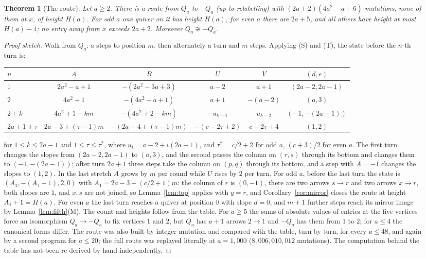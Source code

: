 \documentclass[11pt]{amsart}
\newtheorem{theorem}{Theorem}[section]
\theoremstyle{definition}
\theoremstyle{remark}
\begin{document}
\begin{theorem}[The route]\label{thm:qaroute}
Let $a\ge2$. There is a route from $Q_a$ to $-Q_a$ (up to relabelling) with $(2a+2)(4a^2-a+6)$ mutations, none of them at $x$, of height $H(a)$. For odd $a$ one quiver on it has height $H(a)$, for even $a$ there are $2a+5$, and all others have height at most $H(a)-1$; no entry away from $x$ exceeds $2a+2$. Moreover $Q_a\not\cong-Q_a$.
\end{theorem}
\begin{proof}[Proof sketch]
Walk from $Q_a$: $a$ steps to position $m$, then alternately a turn and $m$ steps. Applying (S) and (T), the state before the $n$-th turn is:
\begin{center}\footnotesize
\begin{tabular}{l@{\ \ }c@{\ \ }c@{\ \ }c@{\ \ }c@{\ \ }c}
\toprule
$n$ & $A$ & $B$ & $U$ & $V$ & $(d,e)$\\
\midrule
$1$ & $2a^2-a+1$ & $-(2a^2-3a+3)$ & $a-2$ & $a+1$ & $(2a-2,2a-1)$\\
$2$ & $4a^2+1$ & $-(4a^2-a+1)$ & $a+1$ & $-(a-2)$ & $(a,3)$\\
$2+k$ & $4a^2+1-km$ & $-(4a^2+2-km)$ & $-u_{k-1}$ & $u_{k-2}$ & $(-1,-(2a-1))$\\
$2a+1+\tau$ & $2a-3+(\tau-1)m$ & $-(2a-4+(\tau-1)m)$ & $-(c-2\tau+2)$ & $c-2\tau+4$ & $(1,2)$\\
\bottomrule
\end{tabular}
\end{center}
for $1\le k\le2a-1$ and $1\le\tau\le\tau^*$, where $u_i=a-2+i(2a-1)$, and $\tau^*=c/2+2$ for odd $a$, $(c+3)/2$ for even $a$. The first turn changes the slopes from $(2a-2,2a-1)$ to $(a,3)$, and the second passes the column on $(r,s)$ through its bottom and changes them to $(-1,-(2a-1))$; after turn $2a+1$ three steps take the column on $(p,q)$ through its bottom, and a step with $A=-1$ changes the slopes to $(1,2)$. In the last stretch $A$ grows by $m$ per round while $U$ rises by $2$ per turn. For odd $a$, before the last turn the state is $(A_1,-(A_1-1),2,0)$ with $A_1=2a-3+(c/2+1)m$: the column of $r$ is $(0,-1)$, there are two arrows $s\to r$ and two arrows $x\to r$, both slopes are $1$, and $x,s$ are not joined, so Lemma~\ref{lem:top} applies with $y=r$, and Corollary~\ref{cor:mirror} closes the route at height $A_1+1=H(a)$. For even $a$ the last turn reaches a quiver at position $0$ with slope $d=0$, and $m+1$ further steps reach its mirror image by Lemma~\ref{lem:fifth}(M). The count and heights follow from the table. For $a\ge5$ the sums of absolute values of entries at the five vertices force an isomorphism $Q_a\to-Q_a$ to fix vertices $1$ and $2$, but $Q_a$ has $a+1$ arrows $2\to1$ and $-Q_a$ has them from $1$ to $2$; for $a\le4$ the canonical forms differ. The route was also built by integer mutation and compared with the table, turn by turn, for every $a\le48$, and again by a second program for $a\le20$; the full route was replayed literally at $a=1{,}000$ ($8{,}006{,}010{,}012$ mutations). The computation behind the table has not been re-derived by hand independently.
\end{proof}
\end{document}

